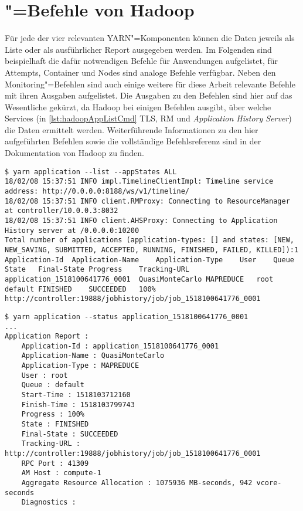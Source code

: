 \chapter{"=Befehle von Hadoop}
\label{app:hadoopCmds}

Für jede der vier relevanten YARN"=Komponenten können die Daten jeweils als Liste oder als ausführlicher Report ausgegeben werden.
Im Folgenden sind beispielhaft die dafür notwendigen Befehle für Anwendungen aufgelistet, für Attempts, Container und Nodes sind analoge Befehle verfügbar.
Neben den Monitoring"=Befehlen sind auch einige weitere für diese Arbeit relevante Befehle mit ihren Ausgaben aufgelistet.
Die Ausgaben zu den Befehlen sind hier auf das Wesentliche gekürzt, \uA da Hadoop bei einigen Befehlen ausgibt, über welche Services (in \cref{lst:hadoopAppListCmd} \zB \gls{TLS}, \gls{RM} und \emph{Application History Server}) die Daten ermittelt werden.
Weiterführende Informationen zu den hier aufgeführten Befehlen sowie die vollständige Befehlsreferenz sind in der Dokumentation von Hadoop \cite{HadoopYarnCmds271} zu finden.

\begin{lstlisting}[label=lst:hadoopAppListCmd,style=plain,
caption={[\glsentryshort{CLI}"=Ausgabe der Anwendungsliste]
    \acrshort{CLI}"=Ausgabe der Anwendungsliste.
    Anwendungen können mithilfe der Optionen \mbox{\texttt{-{}-appTypes}} und \mbox{\texttt{-{}-appStates}} gefiltert werden.}]
$ yarn application --list --appStates ALL
18/02/08 15:37:51 INFO impl.TimelineClientImpl: Timeline service address: http://0.0.0.0:8188/ws/v1/timeline/
18/02/08 15:37:51 INFO client.RMProxy: Connecting to ResourceManager at controller/10.0.0.3:8032
18/02/08 15:37:51 INFO client.AHSProxy: Connecting to Application History server at /0.0.0.0:10200
Total number of applications (application-types: [] and states: [NEW, NEW_SAVING, SUBMITTED, ACCEPTED, RUNNING, FINISHED, FAILED, KILLED]):1
Application-Id	Application-Name	Application-Type	User	Queue	State	Final-State	Progress	Tracking-URL
application_1518100641776_0001	QuasiMonteCarlo	MAPREDUCE	root	default	FINISHED	SUCCEEDED	100%	http://controller:19888/jobhistory/job/job_1518100641776_0001
\end{lstlisting}

\begin{lstlisting}[label=lst:hadoopAppDetailsCmd,style=plain,
caption={[\glsentryshort{CLI}"=Ausgabe des Reports einer Anwendung]
    \acrshort{CLI}"=Ausgabe des Reports einer Anwendung}]
$ yarn application --status application_1518100641776_0001
...
Application Report : 
    Application-Id : application_1518100641776_0001
    Application-Name : QuasiMonteCarlo
    Application-Type : MAPREDUCE
    User : root
    Queue : default
    Start-Time : 1518103712160
    Finish-Time : 1518103799743
    Progress : 100%
    State : FINISHED
    Final-State : SUCCEEDED
    Tracking-URL : http://controller:19888/jobhistory/job/job_1518100641776_0001
    RPC Port : 41309
    AM Host : compute-1
    Aggregate Resource Allocation : 1075936 MB-seconds, 942 vcore-seconds
    Diagnostics :
\end{lstlisting}

